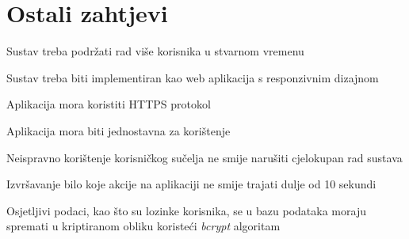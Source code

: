 	
		\section{Ostali zahtjevi}
			
			\begin{packed_item}
				\item Sustav treba podržati rad više korisnika u stvarnom vremenu
				\item Sustav treba biti implementiran kao web aplikacija s responzivnim dizajnom
				\item Aplikacija mora koristiti HTTPS protokol
				\item Aplikacija mora biti jednostavna za korištenje
				\item Neispravno korištenje korisničkog sučelja ne smije narušiti cjelokupan rad sustava
				\item Izvršavanje bilo koje akcije na aplikaciji ne smije trajati dulje od 10 sekundi
				\item Osjetljivi podaci, kao što su lozinke korisnika, se u bazu podataka moraju spremati u kriptiranom obliku koristeći \textit{bcrypt} algoritam
			\end{packed_item}
			